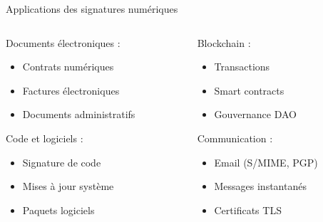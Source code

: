 \begin{frame}{Applications des signatures numériques}
  \begin{columns}
    \begin{column}{0.5\textwidth}
      Documents électroniques :
      \begin{itemize}
        \item Contrats numériques
        \item Factures électroniques
        \item Documents administratifs
      \end{itemize}

      Code et logiciels :
      \begin{itemize}
        \item Signature de code
        \item Mises à jour système
        \item Paquets logiciels
      \end{itemize}
    \end{column}

    \begin{column}{0.5\textwidth}
      Blockchain :
      \begin{itemize}
        \item Transactions
        \item Smart contracts
        \item Gouvernance DAO
      \end{itemize}

      Communication :
      \begin{itemize}
        \item Email (S/MIME, PGP)
        \item Messages instantanés
        \item Certificats TLS
      \end{itemize}
    \end{column}
  \end{columns}
\end{frame}

